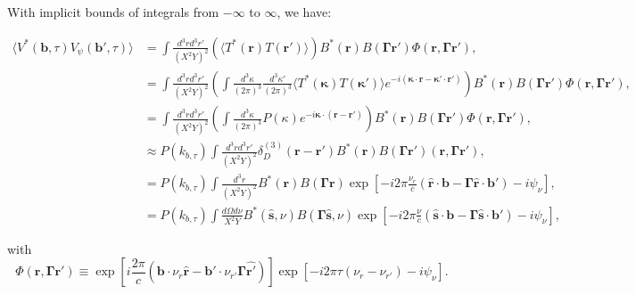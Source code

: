 \documentclass[twocolumn,apj,numberedappendix]{emulateapj}
\renewcommand\[{\begin{equation}}
\renewcommand\]{\end{equation}}
\begin{document}
With implicit bounds of integrals from $-\infty$ to $\infty$, we have:
\begin{widetext}
\begin{equation}
\begin{aligned} \langle V^{*}(\boldsymbol{b},\tau)V_{\psi}(\boldsymbol{b'},\tau)\rangle
 & =\int \frac{d^{3}rd^{3}r'}{(X^2Y)^2}\left(\langle T^{*}(\boldsymbol{r})T(\boldsymbol{r'})\rangle\right)B^{*}(\boldsymbol{r})B(\boldsymbol{\Gamma} \boldsymbol{r'})\Phi(\boldsymbol{r},\boldsymbol{\Gamma} \boldsymbol{r'}),\\
 & =\int \frac{d^{3}rd^{3}r'}{(X^2Y)^2}\left(\int\frac{d^{3}\kappa}{(2\pi)^{3}}\frac{d^{3}\kappa'}{(2\pi)^{3}}\langle T^{*}(\boldsymbol{\kappa})T(\boldsymbol{\kappa'})\rangle e^{-i(\boldsymbol{\kappa}\cdot \boldsymbol{r}-\boldsymbol{\kappa'}\cdot\boldsymbol{r'})}\right)B^{*}(\boldsymbol{r})B(\boldsymbol{\Gamma} \boldsymbol{r'})\Phi(\boldsymbol{r},\boldsymbol{\Gamma} \boldsymbol{r'}),\\
 & =\int \frac{d^{3}rd^{3}r'}{(X^2Y)^2}\left(\int\frac{d^{3}\kappa}{(2\pi)^{3}}P(\kappa)e^{-i\boldsymbol{\kappa}\cdot(\boldsymbol{r}-\boldsymbol{r'})}\right)B^{*}(\boldsymbol{r})B(\boldsymbol{\Gamma} \boldsymbol{r'})\Phi(\boldsymbol{r},\boldsymbol{\Gamma} \boldsymbol{r'}),\\
 & \approx P(k_{b,\tau})\int \frac{d^{3}rd^{3}r'}{(X^2Y)^2} \delta_{D}^{(3)}(\boldsymbol{r}-\boldsymbol{r'})B^{*}(\boldsymbol{r})B(\boldsymbol{\Gamma} \boldsymbol{r'})(\boldsymbol{r},\boldsymbol{\Gamma} \boldsymbol{r'}),\\
 & = P(k_{b,\tau})\int \frac{d^{3}r}{(X^2Y)^2}B^{*}(\boldsymbol{r})B(\boldsymbol{\Gamma} \boldsymbol{r})\exp\left[-i2\pi\frac{\nu_{r}}{c}\left(\hat{\boldsymbol{r}}\cdot\boldsymbol{b}-\boldsymbol{\Gamma} \hat{\boldsymbol{r}}\cdot\boldsymbol{b'}\right)-i\psi_{\nu}\right],\\
 & = P(k_{b,\tau})\int\frac{d\Omega d\nu}{X^{2}Y}B^{*}(\hat{\boldsymbol{s}},\nu)B(\boldsymbol{\Gamma} \hat{\boldsymbol{s}},\nu)\exp\left[-i2\pi\frac{\nu}{c}\left(\hat{\boldsymbol{s}}\cdot\boldsymbol{b}-\boldsymbol{\Gamma}\hat{\boldsymbol{s}}\cdot\boldsymbol{b'}\right)-i\psi_{\nu}\right],
\end{aligned}
\label{eq:main}
\end{equation}

with
\begin{equation}
\Phi(\boldsymbol{r},\boldsymbol{\Gamma} \boldsymbol{r'})\equiv\exp\left[i\frac{2\pi}{c}\left(\boldsymbol{b}\cdot\nu_{r}\hat{\boldsymbol{r}}-\boldsymbol{b'}\cdot\nu_{r'}\boldsymbol{\Gamma}\hat{\boldsymbol{r'}}\right)\right]\exp\left[-i2\pi\tau\left(\nu_{r}-\nu_{r'}\right)-i\psi_{\nu}\right].
\end{equation}

\end{widetext}
\end{document}
